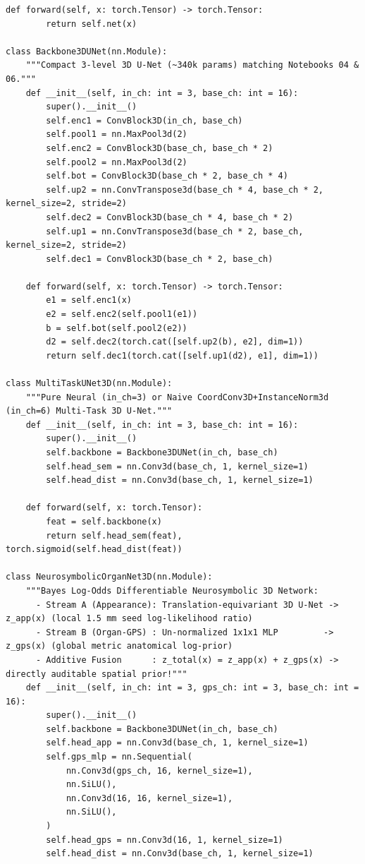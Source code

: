 \documentclass[10pt,a4paper]{article}
\begin{document}
\begin{codebox}
\begin{lstlisting}[style=pybmed]
    def forward(self, x: torch.Tensor) -> torch.Tensor:
        return self.net(x)

class Backbone3DUNet(nn.Module):
    """Compact 3-level 3D U-Net (~340k params) matching Notebooks 04 & 06."""
    def __init__(self, in_ch: int = 3, base_ch: int = 16):
        super().__init__()
        self.enc1 = ConvBlock3D(in_ch, base_ch)
        self.pool1 = nn.MaxPool3d(2)
        self.enc2 = ConvBlock3D(base_ch, base_ch * 2)
        self.pool2 = nn.MaxPool3d(2)
        self.bot = ConvBlock3D(base_ch * 2, base_ch * 4)
        self.up2 = nn.ConvTranspose3d(base_ch * 4, base_ch * 2, kernel_size=2, stride=2)
        self.dec2 = ConvBlock3D(base_ch * 4, base_ch * 2)
        self.up1 = nn.ConvTranspose3d(base_ch * 2, base_ch, kernel_size=2, stride=2)
        self.dec1 = ConvBlock3D(base_ch * 2, base_ch)

    def forward(self, x: torch.Tensor) -> torch.Tensor:
        e1 = self.enc1(x)
        e2 = self.enc2(self.pool1(e1))
        b = self.bot(self.pool2(e2))
        d2 = self.dec2(torch.cat([self.up2(b), e2], dim=1))
        return self.dec1(torch.cat([self.up1(d2), e1], dim=1))

class MultiTaskUNet3D(nn.Module):
    """Pure Neural (in_ch=3) or Naive CoordConv3D+InstanceNorm3d (in_ch=6) Multi-Task 3D U-Net."""
    def __init__(self, in_ch: int = 3, base_ch: int = 16):
        super().__init__()
        self.backbone = Backbone3DUNet(in_ch, base_ch)
        self.head_sem = nn.Conv3d(base_ch, 1, kernel_size=1)
        self.head_dist = nn.Conv3d(base_ch, 1, kernel_size=1)

    def forward(self, x: torch.Tensor):
        feat = self.backbone(x)
        return self.head_sem(feat), torch.sigmoid(self.head_dist(feat))

class NeurosymbolicOrganNet3D(nn.Module):
    """Bayes Log-Odds Differentiable Neurosymbolic 3D Network:
      - Stream A (Appearance): Translation-equivariant 3D U-Net -> z_app(x) (local 1.5 mm seed log-likelihood ratio)
      - Stream B (Organ-GPS) : Un-normalized 1x1x1 MLP         -> z_gps(x) (global metric anatomical log-prior)
      - Additive Fusion      : z_total(x) = z_app(x) + z_gps(x) -> directly auditable spatial prior!"""
    def __init__(self, in_ch: int = 3, gps_ch: int = 3, base_ch: int = 16):
        super().__init__()
        self.backbone = Backbone3DUNet(in_ch, base_ch)
        self.head_app = nn.Conv3d(base_ch, 1, kernel_size=1)
        self.gps_mlp = nn.Sequential(
            nn.Conv3d(gps_ch, 16, kernel_size=1),
            nn.SiLU(),
            nn.Conv3d(16, 16, kernel_size=1),
            nn.SiLU(),
        )
        self.head_gps = nn.Conv3d(16, 1, kernel_size=1)
        self.head_dist = nn.Conv3d(base_ch, 1, kernel_size=1)


\end{lstlisting}
\end{codebox}
\end{document}
